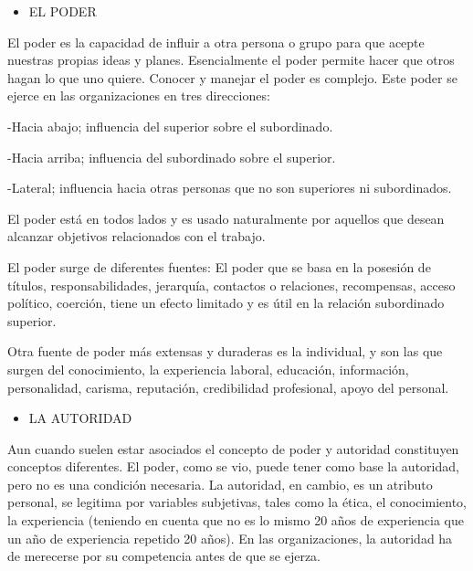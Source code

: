 \begin{itemize}
  \item EL PODER
\end{itemize}
El poder es la capacidad de influir a otra persona o grupo para que acepte nuestras propias ideas y planes. Esencialmente el poder permite hacer que otros hagan lo que uno quiere. Conocer y manejar el poder es complejo. Este poder se ejerce en las organizaciones en tres direcciones:

-Hacia abajo; influencia del superior sobre el subordinado.

-Hacia arriba; influencia del subordinado sobre el superior.

{\centering -Lateral; influencia hacia otras personas que no son superiores ni subordinados.\par}

El poder está en todos lados y es usado naturalmente por aquellos que desean alcanzar objetivos relacionados con el trabajo.



El poder surge de diferentes fuentes: El poder que se basa en la posesión de títulos, responsabilidades, jerarquía, contactos o relaciones, recompensas, acceso político, coerción, tiene un efecto limitado y es útil en la relación subordinado superior.

Otra fuente de poder más extensas y duraderas es la individual, y son las que surgen del conocimiento, la experiencia laboral, educación, información, personalidad, carisma, reputación, credibilidad profesional, apoyo del personal.

\begin{itemize}
  \item LA AUTORIDAD
\end{itemize}
Aun cuando suelen estar asociados el concepto de poder y autoridad constituyen conceptos diferentes. El poder, como se vio, puede tener como base la autoridad, pero no es una condición necesaria. La autoridad, en cambio, es un atributo personal, se legitima por variables subjetivas, tales como la ética, el conocimiento, la experiencia (teniendo en cuenta que no es lo mismo 20 años de experiencia que un año de experiencia repetido 20 años). En las organizaciones, la autoridad ha de merecerse por su competencia antes de que se ejerza.

